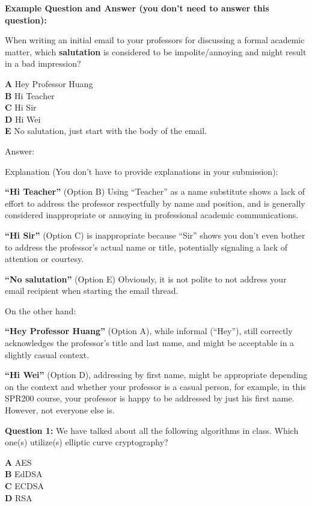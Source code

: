 \documentclass[answer]{exam}  %
\begin{document}
\textbf{Example Question and Answer (you don't need to answer this question):}

When writing an initial email to your professors for discussing a formal academic matter, which \textbf{salutation} is considered to be impolite/annoying and might result in a bad impression?

\textbf{A} Hey Professor Huang \\
\textbf{B} Hi Teacher \\
\textbf{C} Hi Sir \\
\textbf{D} Hi Wei  \\
\textbf{E} No salutation, just start with the body of the email.

Answer: 

Explanation (You don't have to provide explanations in your submission):

\textbf{``Hi Teacher''} (Option B) Using ``Teacher'' as a name substitute shows a lack of effort to address the professor respectfully by name and position, and is generally considered inappropriate or annoying in professional academic communications.

\textbf{``Hi Sir''} (Option C) is inappropriate because ``Sir'' shows you don't even bother to address the professor's actual name or title, potentially signaling a lack of attention or courtesy.

\textbf{``No salutation''} (Option E) Obviously, it is not polite to not address your email recipient when starting the email thread.

On the other hand:

\textbf{``Hey Professor Huang''} (Option A), while informal (``Hey''), still correctly acknowledges the professor's title and last name, and might be acceptable in a slightly casual context.

\textbf{``Hi Wei''} (Option D), addressing by first name, might be appropriate depending on the context and whether your professor is a casual person, for example, in this SPR200 course, your professor is happy to be addressed by just his first name. However, not everyone else is.

\qnewpage
\fi





\ifanswer\else
\textbf{Question 1:} We have talked about all the following algorithms in class. Which one(s) utilize(s) elliptic curve cryptography?

\textbf{A} AES \\
\textbf{B} EdDSA \\
\textbf{C} ECDSA \\
\textbf{D} RSA  
\fi
\end{document}
